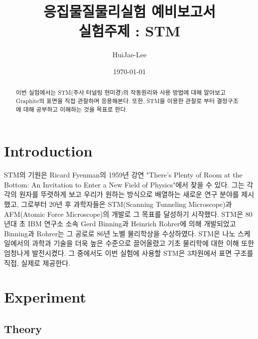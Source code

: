 \documentclass[aps,reprint,superscriptaddress,11pt]{revtex4-2}
\begin{document}
\title{응집물질물리실험 예비보고서 \\
\small 실험주제 : STM}

\author{HuiJae-Lee}

\date{\today}


\begin{abstract}
 이번 실험에서는 STM(주사 터널링 현미경)의 작동원리와 사용 방법에 대해 알아보고 
 Graphite의 표면을 직접 관찰하며 응용해본다. 또한, STM을 이용한 관찰로 부터 결정구조에 대해
 공부하고 이해하는 것을 목표로 한다.
\end{abstract}

\maketitle

\section[Introduction]{Introduction}
STM의 기원은 Ricard Fyenman의 1959년 강연 "There's Plenty of Room at the Bottom: 
An Invitation to Enter a New Field of Physics"에서 찾을 수 있다. 그는 각각의 
원자를 뚜렷하게 보고 우리가 원하는 방식으로 배열하는 새로운 연구 분야를 
제시했고, 그로부터 20년 후 과학자들은 STM(Scanning Tunneling Microscope)과 
AFM(Atomic Force Microscope)의 개발로 그 목표를 달성하기 시작했다. 
STM은 80년대 초 IBM 연구소 소속 Gerd Binning과 Heinrich Rohrer에 의해 개발되었고 
Binning과 Rohrer는 그 공로로 86년 노벨 물리학상을 수상하였다.
STM은 나노 스케일에서의 과학과 기술을 더욱 높은 수준으로 끌어올렸고 기초 물리학에 대한 
이해 또한 엄청나게 발전시켰다. 그 중에서도 이번 실험에 사용할 STM은 3차원에서 표면 구조를 
직접, 실제로 제공한다.
\section[Experiment]{Experiment}
\subsection{Theory}
\end{document}
